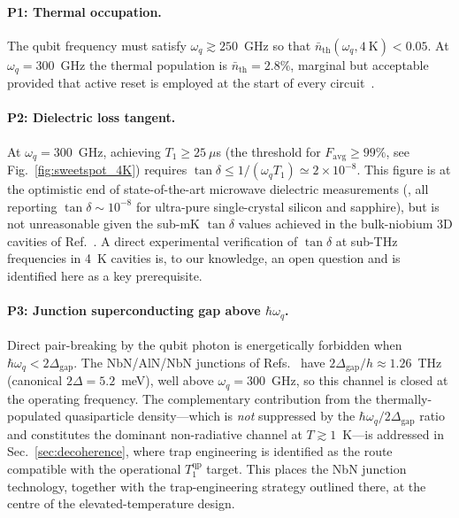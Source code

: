 \paragraph{P1: Thermal occupation.}
The qubit frequency must satisfy
$\omega_q \gtrsim 250$~GHz so that
$\bar{n}_{\text{th}}(\omega_q,4~\text{K}) < 0.05$. At $\omega_q = 300$~GHz
the thermal population is $\bar{n}_{\text{th}} = 2.8\%$, marginal but
acceptable provided that active reset is employed at the start of every
circuit~\cite{blais2021circuit}.

\paragraph{P2: Dielectric loss tangent.}
At $\omega_q = 300$~GHz, achieving $T_1 \ge 25~\mu$s
(the threshold for $F_{\text{avg}}\ge 99\%$, see Fig.~\ref{fig:sweetspot_4K})
requires
$\tan\delta \le 1/(\omega_q T_1) \simeq 2\!\times\!10^{-8}$.
This figure is at the optimistic end of state-of-the-art
microwave dielectric measurements
(\cite{Krupka1999Sapphire, Wang2015, Read2023Sapphire}, all reporting
$\tan\delta\sim 10^{-8}$ for ultra-pure single-crystal silicon and
sapphire), but is not unreasonable given the sub-mK $\tan\delta$ values
achieved in the bulk-niobium 3D cavities of
Ref.~\cite{Romanenko2020}. A direct experimental verification of $\tan\delta$
at sub-THz frequencies in 4~K cavities is, to our knowledge, an open question
and is identified here as a key prerequisite.

\paragraph{P3: Junction superconducting gap above $\hbar\omega_q$.}
Direct pair-breaking by the qubit photon is energetically forbidden when
$\hbar\omega_q < 2\Delta_{\text{gap}}$. The NbN/AlN/NbN
junctions of Refs.~\cite{nakamura2011epitaxialNbN, Delahaye2015} have
$2\Delta_{\text{gap}}/h \approx 1.26$~THz (canonical $2\Delta = 5.2$~meV), well above $\omega_q = 300$~GHz,
so this channel is closed at the operating frequency.  The
complementary contribution from the thermally-populated quasiparticle
density---which is \emph{not} suppressed by the
$\hbar\omega_q / 2\Delta_{\text{gap}}$ ratio and constitutes the dominant
non-radiative channel at $T\gtrsim 1$~K---is addressed in
Sec.~\ref{sec:decoherence}, where trap engineering is identified as the
route compatible with the operational $T_1^{\text{qp}}$ target.
This places the NbN junction technology, together with the trap-engineering
strategy outlined there, at the centre of the elevated-temperature design.

